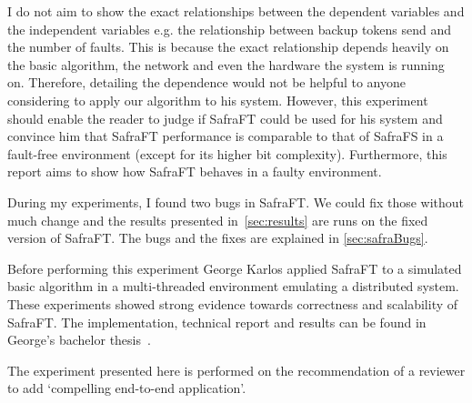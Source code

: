 I do not aim to show the exact relationships between the dependent variables and the independent variables e.g. the relationship between backup tokens send and the number of faults.
This is because the exact relationship depends heavily on the basic algorithm, the network and even the hardware the system is running on.
Therefore, detailing the dependence would not be helpful to anyone considering to apply our algorithm to his system.
However, this experiment should enable the reader to judge if SafraFT could be used for his system and convince him that SafraFT performance is comparable to that of SafraFS in a fault-free environment (except for its higher bit complexity).
Furthermore, this report aims to show how SafraFT behaves in a faulty environment.

During my experiments, I found two bugs in SafraFT.
We could fix those without much change and the results presented in~\cref{sec:results} are runs on the fixed version of SafraFT.
The bugs and the fixes are explained in \cref{sec:safraBugs}.

Before performing this experiment George Karlos applied SafraFT to a simulated basic algorithm in a multi-threaded environment emulating a distributed system.
These experiments showed strong evidence towards correctness and scalability of SafraFT.
The implementation, technical report and results can be found in George's bachelor thesis~\cite{karlos}.

The experiment presented here is performed on the recommendation of a reviewer to add `compelling end-to-end application'.
